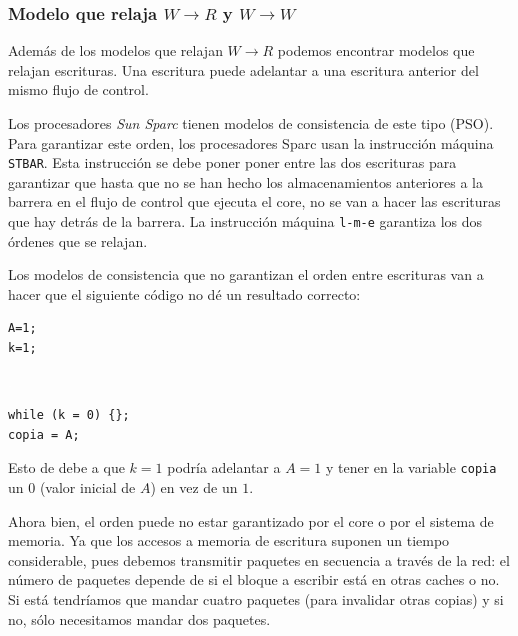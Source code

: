 \documentclass[10pt,a4paper,spanish]{report}
\begin{document}
\textcolor[rgb]{0.2,0.4,0.8}{\subsubsection{Modelo que relaja $W \rightarrow R$ y $W \rightarrow W$}}
Además de los modelos que relajan $W \rightarrow R$ podemos encontrar modelos que relajan escrituras. Una escritura puede adelantar a una escritura anterior del mismo flujo de control.

Los procesadores \textcolor[rgb]{0.2,0.4,0.8}{\textit{Sun Sparc}} tienen modelos de consistencia de este tipo (PSO). Para garantizar este orden, los procesadores Sparc usan la instrucción máquina \verb*|STBAR|. Esta instrucción se debe poner poner entre las dos escrituras para garantizar que hasta que no se han hecho los almacenamientos anteriores a la barrera en el flujo de control que ejecuta el core, no se van a hacer las escrituras que hay detrás de la barrera. La instrucción máquina \verb*|l-m-e| garantiza los dos órdenes que se relajan.

Los modelos de consistencia que no garantizan el orden entre escrituras van a hacer que el siguiente código no dé un resultado correcto:

\begin{center}
\begin{minipage}{0.2\textwidth}
\begin{verbatim}
A=1;
k=1;
\end{verbatim}
\end{minipage}
\begin{minipage}{0.3\textwidth}
\textcolor{White}{.}
\end{minipage}
\begin{minipage}{0.3\textwidth}
\begin{verbatim}
while (k = 0) {};
copia = A;
\end{verbatim}
\end{minipage}
\end{center}

Esto de debe a que $k=1$ podría adelantar a $A=1$ y tener en la variable \verb*|copia| un $0$ (valor inicial de $A$) en vez de un $1$.

Ahora bien, el orden puede no estar garantizado por el core o por el sistema de memoria. Ya que los accesos a memoria de escritura suponen un tiempo considerable, pues debemos transmitir paquetes en secuencia a través de la red: el número de paquetes depende de si el bloque a escribir está en otras caches o no. Si está tendríamos que mandar cuatro paquetes (para invalidar otras copias) y si no, sólo necesitamos mandar dos paquetes.
\end{document}
